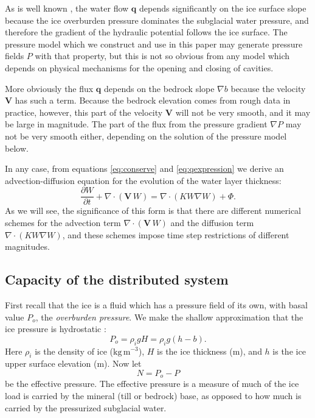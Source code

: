 \documentclass[11pt,final]{amsart}%
\newcommand\bV{\mathbf{V}}
\newcommand\bq{\mathbf{q}}
\newcommand{\Div}{\nabla\cdot}
\newcommand{\grad}{\nabla}
\begin{document}
As is well known \citep{Clarke05}, the water flow $\bq$ depends significantly on the ice surface slope because the ice overburden pressure dominates the subglacial water pressure, and therefore the gradient of the hydraulic potential follows the ice surface.  The pressure model which we construct and use in this paper may generate pressure fields $P$ with that property, but this is not so obvious from any model which depends on physical mechanisms for the opening and closing of cavities.

More obviously the flux $\bq$ depends on the bedrock slope $\grad b$ because the velocity $\bV$ has such a term.  Because the bedrock elevation comes from rough data in practice, however, this part of the velocity $\bV$ will not be very smooth, and it may be large in magnitude.  The part of the flux from the pressure gradient $\grad P$ may not be very smooth either, depending on the solution of the pressure model below.

In any case, from equations \eqref{eq:conserve} and \eqref{eq:qexpression} we derive an advection-diffusion equation \citep{HundsdorferVerwer2010} for the evolution of the water layer thickness:
\begin{equation} \label{eq:adeqn}
  \frac{\partial W}{\partial t} + \Div\left(\bV\, W\right) = \Div \left(K W \grad W\right) + \Phi.
\end{equation}
As we will see, the significance of this form is that there are different numerical schemes for the advection term $\Div\left(\bV\, W\right)$ and the diffusion term $\Div \left(K W \grad W\right)$, and these schemes impose time step restrictions of different magnitudes.

\subsection*{Capacity of the distributed system}  First recall that the ice is a fluid which has a pressure field of its own, with basal value $P_o$, the \emph{overburden pressure}.  We make the shallow approximation that the ice pressure is hydrostatic \citep{GreveBlatter2009}:
\begin{equation} \label{eq:hydrostatic}
  P_o = \rho_i g H = \rho_i g (h-b).
\end{equation}
Here $\rho_i$ is the density of ice ($\text{kg}\,\text{m}^{-3}$), $H$ is the ice thickness (m), and $h$ is the ice upper surface elevation (m).  Now let
\begin{equation}
N = P_o - P\label{eq:effective}
\end{equation}
be the effective pressure.  The effective pressure is a measure of much of the ice load is carried by the mineral (till or bedrock) base, as opposed to how much is carried by the pressurized subglacial water.
\end{document}
